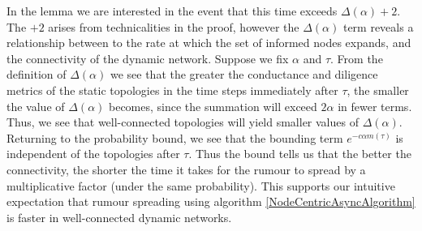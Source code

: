 In the lemma we are interested in the event that this time exceeds $\Delta(\alpha) + 2$. 
The  $+2$ arises from technicalities in the proof, however the $\Delta(\alpha)$ term reveals a relationship between to the rate at which the set of informed nodes expands, and the connectivity of the dynamic network. %
Suppose we fix $\alpha$ and $\tau$. From the definition of $\Delta(\alpha)$ we see that the greater the conductance and diligence metrics of the static topologies in the time steps immediately after $\tau$, the smaller the value of $\Delta(\alpha)$ becomes, since the summation will exceed $2\alpha$ in fewer terms. Thus, we see that well-connected topologies will yield smaller values of $\Delta(\alpha)$. Returning to the probability bound, we see that the bounding term $e^{-c\alpha m(\tau)}$ is independent of the topologies after $\tau$. Thus the bound tells us that the better the connectivity, the shorter the time it takes for the rumour to spread by a multiplicative factor (under the same probability). %
This supports our intuitive expectation that rumour spreading using algorithm \ref{NodeCentricAsyncAlgorithm} is faster in well-connected dynamic networks. %



